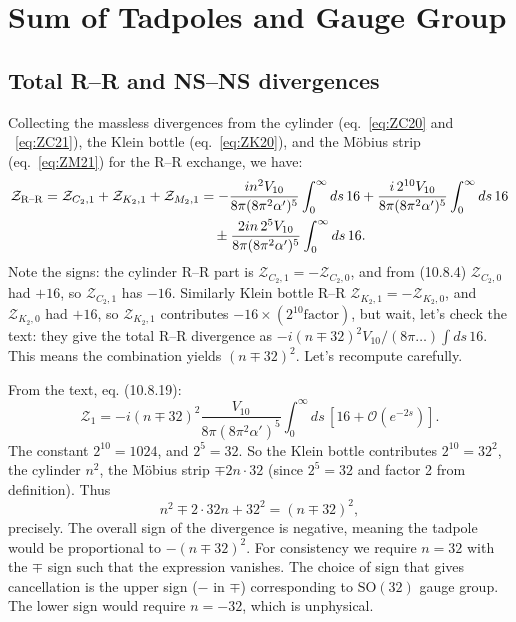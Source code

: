 \documentclass[11pt,a4paper]{article}
\begin{document}
\section{Sum of Tadpoles and Gauge Group}
\subsection{Total R–R and NS–NS divergences}
Collecting the massless divergences from the cylinder (eq.~\ref{eq:ZC20} and ~\ref{eq:ZC21}), the Klein bottle (eq.~\ref{eq:ZK20}), and the M\"obius strip (eq.~\ref{eq:ZM21}) for the R–R exchange, we have:
\begin{align}
\mathcal{Z}_{\text{R–R}} = \mathcal{Z}_{C_2,1} + \mathcal{Z}_{K_2,1} + \mathcal{Z}_{M_2,1}
&= -\frac{i n^2 V_{10}}{8\pi (8\pi^2\alpha')^5} \int_0^\infty ds\, 16
   + \frac{i \, 2^{10} V_{10}}{8\pi (8\pi^2\alpha')^5} \int_0^\infty ds\, 16 \notag \\
   &\quad \pm \frac{2 i n \, 2^5 V_{10}}{8\pi (8\pi^2\alpha')^5} \int_0^\infty ds\, 16 .
\end{align}
Note the signs: the cylinder R–R part is $\mathcal{Z}_{C_2,1} = -\mathcal{Z}_{C_2,0}$, and from (10.8.4) $\mathcal{Z}_{C_2,0}$ had $+16$, so $\mathcal{Z}_{C_2,1}$ has $-16$. Similarly Klein bottle R–R $\mathcal{Z}_{K_2,1} = -\mathcal{Z}_{K_2,0}$, and $\mathcal{Z}_{K_2,0}$ had $+16$, so $\mathcal{Z}_{K_2,1}$ contributes $-16 \times (2^{10}\text{factor})$, but wait, let's check the text: they give the total R–R divergence as $-i (n \mp 32)^2 V_{10}/(8\pi\dots) \int ds\, 16$. This means the combination yields $(n \mp 32)^2$. Let's recompute carefully.

From the text, eq. (10.8.19):
\begin{equation}
\mathcal{Z}_1 = -i (n \mp 32)^2 \frac{V_{10}}{8\pi (8\pi^2\alpha')^5} \int_0^\infty ds\, [16 + \mathcal{O}(e^{-2s})].
\end{equation}
The constant $2^{10} = 1024$, and $2^5 = 32$. So the Klein bottle contributes $2^{10} = 32^2$, the cylinder $n^2$, the M\"obius strip $\mp 2 n \cdot 32$ (since $2^5=32$ and factor 2 from definition). Thus
\begin{equation}
n^2 \mp 2\cdot 32 n + 32^2 = (n \mp 32)^2,
\end{equation}
precisely. The overall sign of the divergence is negative, meaning the tadpole would be proportional to $-(n\mp 32)^2$. For consistency we require $n=32$ with the $\mp$ sign such that the expression vanishes. The choice of sign that gives cancellation is the upper sign ($-$ in $\mp$) corresponding to $\mathrm{SO}(32)$ gauge group. The lower sign would require $n = -32$, which is unphysical.
\end{document}

